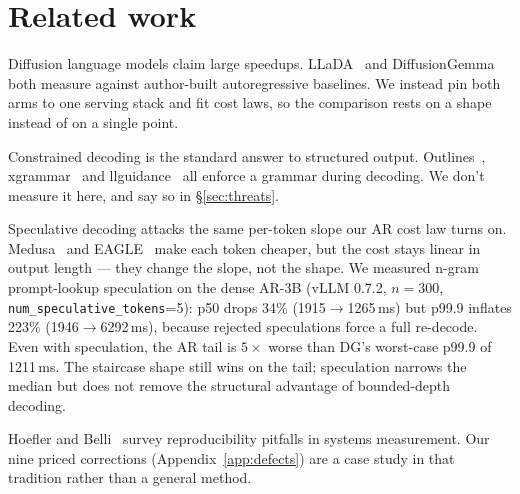 \section{Related work}
\label{sec:related}

Diffusion language models claim large speedups. LLaDA~\cite{llada2025}
and DiffusionGemma~\cite{diffusiongemma} both measure against
author-built autoregressive baselines. We instead pin both arms to one
serving stack and fit cost laws, so the comparison rests on a shape
instead of on a single point.

Constrained decoding is the standard answer to structured
output. Outlines~\cite{outlines2024}, xgrammar~\cite{xgrammar2024} and
llguidance~\cite{llguidance} all enforce a grammar during decoding. We
don't measure it here, and say so in \S\ref{sec:threats}.

Speculative decoding attacks the same per-token slope our AR cost law
turns on. Medusa~\cite{medusa2024} and EAGLE~\cite{eagle2024} make each
token cheaper, but the cost stays linear in output length --- they
change the slope, not the shape. We measured n-gram prompt-lookup
speculation on the dense AR-3B (vLLM 0.7.2, $n{=}300$,
\texttt{num\_speculative\_tokens}{=}5): p50 drops 34\% (1915$\to$1265\,ms)
but p99.9 inflates 223\% (1946$\to$6292\,ms), because rejected
speculations force a full re-decode. Even with speculation, the AR
tail is $5\times$ worse than DG's worst-case p99.9 of 1211\,ms. The
staircase shape still wins on the tail; speculation narrows the median
but does not remove the structural advantage of bounded-depth decoding.

Hoefler and Belli~\cite{hoefler2021} survey reproducibility pitfalls in
systems measurement. Our nine priced corrections
(Appendix~\ref{app:defects}) are a case study in that tradition rather
than a general method.

